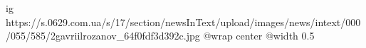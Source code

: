  
 
 
 
 

\ifcmt
  ig https://s.0629.com.ua/s/17/section/newsInText/upload/images/news/intext/000/055/585/2gavriilrozanov_64f0fdf3d392c.jpg
  @wrap center
  @width 0.5
\fi
